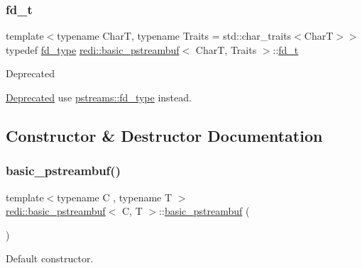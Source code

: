 \subsubsection{\texorpdfstring{fd\+\_\+t}{fd\_t}}
{\footnotesize\ttfamily template$<$typename CharT, typename Traits = std\+::char\+\_\+traits$<$\+Char\+T$>$$>$ \\
typedef \mbox{\hyperlink{structredi_1_1pstreams_add0b7eaed16eb6c22a56012958d85b1d}{fd\+\_\+type}} \mbox{\hyperlink{classredi_1_1basic__pstreambuf}{redi\+::basic\+\_\+pstreambuf}}$<$ CharT, Traits $>$\+::\mbox{\hyperlink{classredi_1_1basic__pstreambuf_aaa33e67df3b5330b2d29f8ceca3d9a15}{fd\+\_\+t}}}

\begin{DoxyRefDesc}{Deprecated}
\item[\mbox{\hyperlink{deprecated__deprecated000001}{Deprecated}}]use \mbox{\hyperlink{structredi_1_1pstreams_add0b7eaed16eb6c22a56012958d85b1d}{pstreams\+::fd\+\_\+type}} instead.\end{DoxyRefDesc}


\subsection{Constructor \& Destructor Documentation}
\mbox{\label{classredi_1_1basic__pstreambuf_ae66decd83183a35608ada0a56cb8d97b}} 
\subsubsection{\texorpdfstring{basic\+\_\+pstreambuf()}{basic\_pstreambuf()}\hspace{0.1cm}{\footnotesize\ttfamily [1/3]}}
{\footnotesize\ttfamily template$<$typename C , typename T $>$ \\
\mbox{\hyperlink{classredi_1_1basic__pstreambuf}{redi\+::basic\+\_\+pstreambuf}}$<$ C, T $>$\+::\mbox{\hyperlink{classredi_1_1basic__pstreambuf}{basic\+\_\+pstreambuf}} (\begin{DoxyParamCaption}{ }\end{DoxyParamCaption})\hspace{0.3cm}{\ttfamily [inline]}}



Default constructor. 

